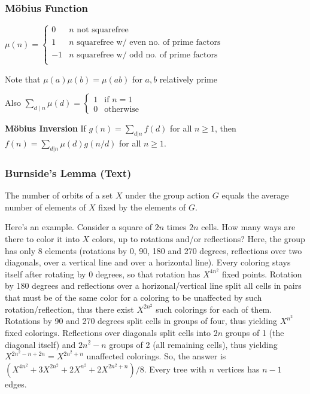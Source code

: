 \documentclass[12pt]{extarticle}
\author{
	Ayush Ranjan, Naman Jain, Manish Tanwar
}
\begin{document}
\maketitle
		\begin{multicols*}{2}
			
			\setlength{\parskip}{0.0in}
			\tableofcontents
			\setlength{\parskip}{0.0in}
			
						
			\subsubsection*{M\"obius Function} %
			$\mu(n) = \begin{cases}
			0 & \text{$n$ not squarefree} \\
			1 & \text{$n$ squarefree w/ even no. of prime factors} \\
			-1 & \text{$n$ squarefree w/ odd no. of prime factors} \\
			\end{cases}$
			\par
			Note that $\mu(a) \mu(b) = \mu(ab)$ for $a, b$ relatively prime
			\par
			Also $\sum_{d \mid n} \mu(d) = \begin{cases} 1 & \text{if $n = 1$} \\
			0 & \text{otherwise} \end{cases}$
			
			\textbf{M\"obius Inversion}
			If $g(n) = \sum_{d|n} f(d)$ for all $n \ge 1$, then
			$f(n) = \sum_{d|n} \mu(d)g(n/d)$ for all $n \ge 1$.
			
			
			\subsubsection*{Burnside's Lemma (Text)} %
			The number of orbits of a set $X$ under the group action $G$ equals the average
			number of elements of $X$ fixed by the elements of $G$.
			
			Here's an example. Consider a square of $2n$ times $2n$ cells. How many ways
			are there to color it into $X$ colors, up to rotations and/or reflections?
			Here, the group has only 8 elements (rotations by 0, 90, 180 and 270 degrees,
			reflections over two diagonals, over a vertical line and over a horizontal
			line). Every coloring stays itself after rotating by 0 degrees, so that
			rotation has $X^{4n^2}$ fixed points. Rotation by 180 degrees and reflections
			over a horizonal/vertical line split all cells in pairs that must be of the
			same color for a coloring to be unaffected by such rotation/reflection, thus
			there exist $X^{2n^2}$ such colorings for each of them. Rotations by 90 and 270
			degrees split cells in groups of four, thus yielding $X^{n^2}$ fixed colorings.
			Reflections over diagonals split cells into $2n$ groups of 1 (the diagonal
			itself) and $2n^2-n$ groups of 2 (all remaining cells), thus yielding
			$X^{2n^2-n+2n}=X^{2n^2+n}$ unaffected colorings.  So, the answer is
			$(X^{4n^2}+3X^{2n^2}+2X^{n^2}+2X^{2n^2+n})/8$.
			Every tree with $n$ vertices has $n-1$ edges.
			

\end{multicols*}
\end{document}

